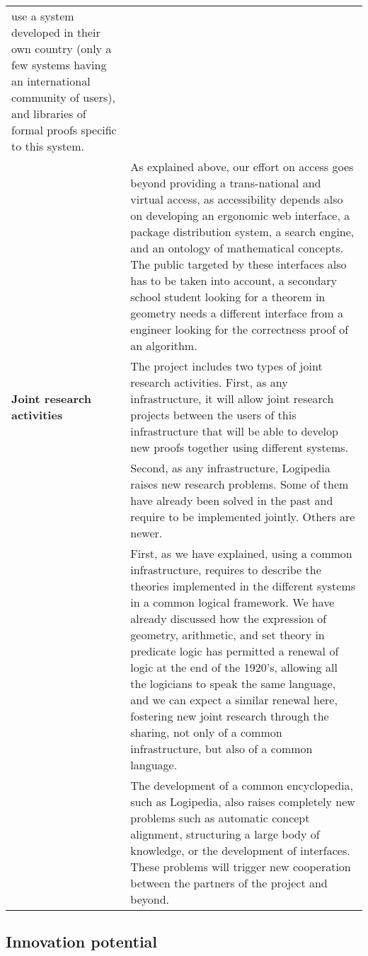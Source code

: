 \begin{longtable}{|p{}|p{}|}
use a system developed in their own country (only a few systems having
an international community of users), and libraries of formal proofs
specific to this system.\\
&
\hspace{0.4cm}
As explained above, our effort on access goes beyond providing a
trans-national and virtual access, as accessibility depends also on
developing an ergonomic web interface, a package distribution system,
a search engine, and an ontology of mathematical concepts. The public
targeted by these interfaces also has to be taken into account, a
secondary school student looking for a theorem in geometry needs a
different interface from a engineer looking for the correctness proof
of an algorithm.\\
\hline
{\bf Joint research activities}
&
The project includes two types of joint research activities.  First,
as any infrastructure, it will allow joint research projects between
the users of this infrastructure that will be able to develop new
proofs together using different systems.\\
&
\hspace{0.4cm}
Second, as any infrastructure, Logipedia raises new research
problems. Some of them have already been solved in the past and
require to be implemented jointly. Others are newer.\\
&
\hspace{0.4cm}
First, as we have explained, using a common infrastructure, requires
to describe the theories implemented in the different systems in a
common logical framework. We have already discussed how the expression
of geometry, arithmetic, and set theory in predicate logic has
permitted a renewal of logic at the end of the 1920's, allowing all
the logicians to speak the same language, and we can expect a similar
renewal here, fostering new joint research through the sharing, not
only of a common infrastructure, but also of a common language.\\
&
\hspace{0.4cm}
The development of a common encyclopedia, such as Logipedia, also
raises completely new problems such as automatic concept alignment,
structuring a large body of knowledge, or the development of
interfaces. These problems will trigger new cooperation between the
partners of the project and beyond.\\
\hline
\end{longtable}

\subsection{Innovation potential}

